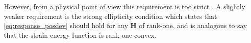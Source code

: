 However, from a physical point of view this requirement is too strict
\cite{ball1976convexity}. A slightly weaker requirement is the strong
ellipticity condition which states that \eqref{eq:response_posdev}
should hold for any $\mathbf{H}$ of rank-one, and is analogous to
say that the strain energy function is rank-one convex. 








